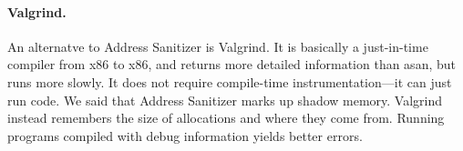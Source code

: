\documentclass[11pt]{article}
\begin{document}
\paragraph{Valgrind.} An alternatve to Address Sanitizer is Valgrind.
It is basically a just-in-time compiler from x86 to x86, and returns
more detailed information than asan, but runs more slowly. It does not
require compile-time instrumentation---it can just run code.
We said that Address Sanitizer marks up shadow memory. Valgrind instead
remembers the size of allocations and where they come from.
Running programs compiled with debug information yields better errors.


\end{document}
